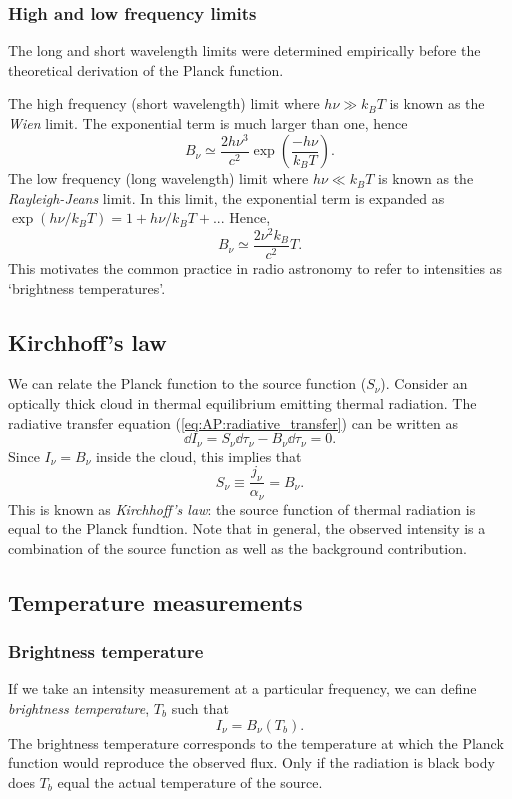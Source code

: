 \subsubsection{High and low frequency limits}
The long and short wavelength limits were determined empirically before the theoretical derivation of the Planck function.
\par 
The high frequency (short wavelength) limit where \(h\nu \gg k_B T\) is known as the \emph{Wien} limit.
 The exponential term is much larger than one, hence
%
\begin{equation}
	B_\nu \simeq \frac{2 h \nu^3}{c^2} \exp(\frac{-h\nu}{k_BT}).
	\label{eq:AP:wien_limit}
\end{equation}
%
The low frequency (long wavelength) limit where \(h\nu \ll k_B T\) is known as the \emph{Rayleigh-Jeans} limit.
 In this limit, the exponential term is expanded as \(\exp( h\nu/k_BT) = 1 + h\nu/k_BT + ...\) Hence,
%
\begin{equation}
	B_\nu \simeq \frac{2 \nu ^2 k_B}{c^2} T.
	\label{eq:AP:rayleigh_jeans_limit}
\end{equation}
%
This motivates the common practice in radio astronomy to refer to intensities as `brightness temperatures'.
%
%
\subsection{Kirchhoff's law}
We can relate the Planck function to the source function (\(S_\nu\)).
 Consider an optically thick cloud in thermal equilibrium emitting thermal radiation.
 The radiative transfer equation (\ref{eq:AP:radiative_transfer}) can be written as
%
\[ \dd{I_\nu} = S_\nu \dd{\tau_\nu} - B_\nu \dd{\tau_\nu} = 0. \]
%
Since \( I_\nu = B_\nu \) inside the cloud, this implies that
%
\begin{equation}
	S_\nu \equiv \frac{j_\nu}{\alpha_\nu} = B_\nu.
	\label{eq:AP:kirchhoff's_law}
\end{equation}
%
This is known as \emph{Kirchhoff's law}: the source function of thermal radiation is equal to the Planck fundtion.
 Note that in general, the observed intensity is a combination of the source function as well as the background contribution.
%
%
\subsection{Temperature measurements}
\subsubsection{Brightness temperature}
If we take an intensity measurement at a particular frequency, we can define \emph{brightness temperature}, \(T_b\) such that
%
\begin{equation}
	I_\nu = B_\nu (T_b).
	\label{eq:AP:brightness_temperature}
\end{equation}
%
The brightness temperature corresponds to the temperature at which the Planck function would reproduce the observed flux.
 Only if the radiation is black body does \(T_b\) equal the actual temperature of the source.
%
